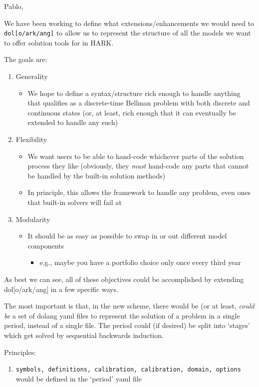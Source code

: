 \documentclass[\econtexRoot/BufferStockTheory]{subfiles}
\begin{document}
\noindent Pablo,

We have been working to define what extensions/enhancements we would need to \texttt{dol[o/ark/ang]} to allow us to represent the structure of all the models we want to offer solution tools for in HARK.

The goals are:
\begin{enumerate}
\item Generality
  \begin{itemize}
  \item We hope to define a syntax/structure rich enough to handle anything that qualifies as a discrete-time Bellman problem with both discrete and continuous states (or, at least, rich enough that it can eventually be extended to handle any such)
  \end{itemize}
\item Flexibility
  \begin{itemize}
  \item  We want users to be able to hand-code whichever parts of the solution process they like (obviously, they \textit{must} hand-code any parts that cannot be handled by the built-in solution methods)
  \item In principle, this allows the framework to handle any problem, even ones that built-in solvers will fail at
  \end{itemize}
\item Modularity
  \begin{itemize}
  \item It should be as easy as possible to swap in or out different model components
    \begin{itemize}
    \item e.g., maybe you have a portfolio choice only once every third year
    \end{itemize}
  \end{itemize}
\end{enumerate}

As best we can see, all of these objectives could be accomplished by extending dol[o/ark/ang] in a few specific ways.

The most important is that, in the new scheme, there would be (or at least, \textit{could be} a set of dolang yaml files to represent the solution of a problem in a single period, instead of a single file.  The period could (if desired) be split into `stages' which get solved by sequential backwards induction.

Principles:
\begin{enumerate}
\item \texttt{symbols, definitions, calibration, calibration, domain, options} would be defined in the `period' yaml file
\end{enumerate}
\end{document}

